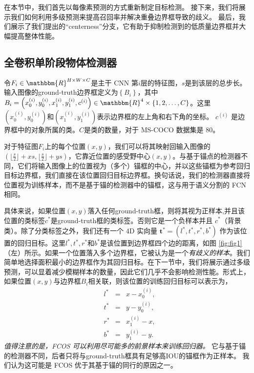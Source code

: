 \documentclass[../main.tex]{subfile}
\begin{document}
在本节中，我们首先以每像素预测的方式重新制定目标检测。 接下来，我们将展示我们如何利用多级预测来提高召回率并解决重叠边界框导致的歧义。 最后，我们展示了我们提出的“centerness”分支，它有助于抑制检测到的低质量边界框并大幅提高整体性能。

\subsection{全卷积单阶段物体检测器}

令$ F_i \in \mathbbm{R}^{H\times W\times C} $是主干 CNN 第$ i $层的特征图，$s $是到该层的总步长。输入图像的ground-truth边界框定义为$\left\{ B_i \right\}$，其中 $ B_i = \left( x_0^{\left(i\right)},y_0^{\left(i\right)},x_1^{\left(i\right)},y_1^{\left(i\right)},c^{\left(i\right)} \right) \in \mathbbm{R}^4 \times \left\{ 1, 2, \ldots, C \right\}$。这里 $\left( x_0^{\left(i\right)},y_0^{\left(i\right)} \right)$和$\left( x_1^{\left(i\right)},y_1^{\left(i\right)} \right)$表示边界框的左上角和右下角的坐标。 $c^{\left(i\right)}$ 是边界框中的对象所属的类。$ C $是类的数量，对于 MS-COCO 数据集是 80。

对于特征图$ F_i $上的每个位置$\left(x, y\right)$，我们可以将其映射回输入图像的$\left( \lfloor \frac{s}{2} \rfloor + xs,  \lfloor \frac{s}{2} \rfloor + ys\right)$，它靠近位置的感受野中心$\left(x, y\right)$。与基于锚点的检测器不同，它们将输入图像上的位置视为（多个）锚框的中心，并以这些锚框为参考回归目标边界框，我们直接在该位置回归目标边界框。换句话说，我们的检测器直接将位置视为训练样本，而不是基于锚的检测器中的锚框，这与用于语义分割的 FCN 相同\cite{fcn}。

具体来说，如果位置$\left(x, y\right)$落入任何ground-truth框，则将其视为正样本,并且该位置的类标签$ c^\ast $是ground-truth框的类标签。否则它是一个负样本并且 $ c^\ast $（背景类）。除了分类标签之外，我们还有一个 4D 实向量 $\mathbf{t}^\ast = (l^\ast, t^\ast, r^\ast, b^\ast)$ 作为该位置的回归目标。这里$l^\ast, t^\ast, r^\ast$和$b^\ast$是该位置到边界框四个边的距离，如图 \ref{fig:fig1}（左）所示。如果一个位置落入多个边界框，它被认为是一个\textit{有歧义的样本}。我们简单地选择面积最小的边界框作为其回归目标。在下一节中，我们将展示通过多级预测，可以显着减少模糊样本的数量，因此它们几乎不会影响检测性能。形式上，如果位置$\left(x, y\right)$与边界框$ B_i $相关联，则该位置的训练回归目标可以表示为，
\begin{equation}\label{equ:position}
    \begin{aligned}
         & l^\ast & = & x - x_0^{\left(i\right)},  \\
         & t^\ast & = & y - y_0^{\left(i\right)},  \\
         & r^\ast & = & x_1^{\left(i\right)} - x , \\
         & b^\ast & = & y_1^{\left(i\right)} - y.
    \end{aligned}
\end{equation}
\textit{值得注意的是，FCOS 可以利用尽可能多的前景样本来训练回归器。} 它与基于锚的检测器不同，后者只将与ground-truth框具有足够高IOU的锚框作为正样本。 我们认为这可能是 FCOS 优于其基于锚的同行的原因之一。
\end{document}
